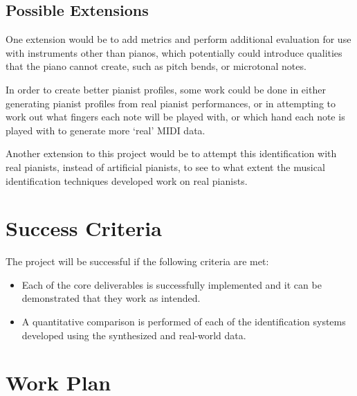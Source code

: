 \documentclass[12pt]{article}
\begin{document}
\subsection{Possible Extensions}
One extension would be to add metrics and perform additional evaluation for use with instruments other than pianos, which potentially could introduce qualities that the piano cannot create, such as pitch bends, or microtonal notes.

In order to create better pianist profiles, some work could be done in either generating pianist profiles from real pianist performances, or in attempting to work out what fingers each note will be played with, or which hand each note is played with to generate more ‘real’ MIDI data.

Another extension to this project would be to attempt this identification with real pianists, instead of artificial pianists, to see to what extent the musical identification techniques developed work on real pianists.

\section{Success Criteria}

The project will be successful if the following criteria are met:
\begin{itemize}
    
  \item
Each of the core deliverables is successfully implemented and it can be demonstrated that they work as intended.

\item
A quantitative comparison is performed of each of the identification systems developed using the synthesized and real-world data.
\end{itemize}

\section{Work Plan}
\end{document}
